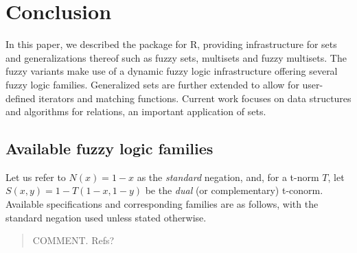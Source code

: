 \documentclass[article]{jss}
\newcommand\R{\textsf{R}}
\newcommand{\comment}[1]{\begin{quote} COMMENT. #1\end{quote}}
\newcommand{\eqn}[1]{$#1$}
\begin{document}
\section{Conclusion}
\label{sec:conclusion}

In this paper, we described the  package for \R, providing
infrastructure for sets and generalizations thereof such as fuzzy
sets, multisets and fuzzy multisets. The fuzzy variants make use of a
dynamic fuzzy logic infrastructure offering several fuzzy logic
families. Generalized sets are further extended to allow for
user-defined iterators and matching functions. Current work focuses on
data structures and algorithms for relations,
an important application of sets.

\begin{appendix}

\section{Available fuzzy logic families}
\label{sec:appendix}

  Let us
  refer to \eqn{N(x) = 1 - x} as the \emph{standard} negation, and,
  for a t-norm \eqn{T}, let \eqn{S(x, y) = 1 - T(1 - x, 1 - y)} be the
  \emph{dual} (or complementary) t-conorm.  Available specifications and
  corresponding families are as follows, with the standard negation used
  unless stated otherwise.
  \comment{Refs?}


\end{appendix}
\end{document}
